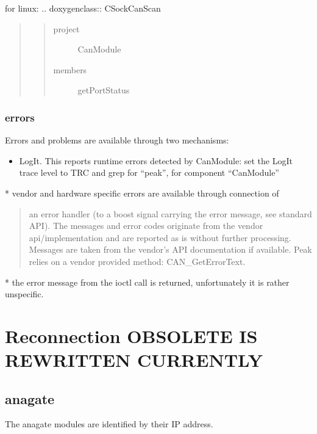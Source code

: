 \documentclass[a4paper,10pt,english]{sphinxmanual}
\begin{document}
for linux:
.. doxygenclass:: CSockCanScan
\begin{quote}
\begin{quote}\begin{description}
\item[{project}] \leavevmode
CanModule

\item[{members}] \leavevmode
getPortStatus

\end{description}\end{quote}
\end{quote}


\subsection{errors}
\label{\detokenize{vendors/peak:errors}}
Errors and problems are available through two mechanisms:
\begin{itemize}
\item {} 
LogIt. This reports runtime errors detected by CanModule:
set the LogIt trace level to TRC and grep for “peak”, for component “CanModule”

\end{itemize}

* vendor and hardware specific errors are available through connection of
\begin{quote}

an error handler (to a boost signal carrying the error message, see standard API).
The messages and error codes originate from the vendor api/implementation and are
reported as is without further processing. Messages are taken from the vendor’s API
documentation if available. Peak relies on a vendor provided method: CAN\_GetErrorText.
\end{quote}

* the error message from the ioctl call is returned, unfortunately it is rather unspecific.


\chapter{Reconnection OBSOLETE IS REWRITTEN CURRENTLY}
\label{\detokenize{reconnection:reconnection-obsolete-is-rewritten-currently}}\label{\detokenize{reconnection::doc}}

\section{anagate}
\label{\detokenize{reconnection:anagate}}
The anagate modules are identified by their IP address.
\end{document}

